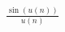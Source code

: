\documentclass[preview]{standalone}
\begin{document}
\begin{align*}
\frac {\sin \left(u(n)\right)} {u(n)}
\end{align*}
\end{document}
